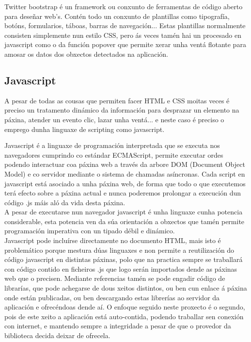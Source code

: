             Twitter bootstrap é un framework ou conxunto de ferramentas de código aberto para 
            deseñar web's. Contén todo un conxunto de plantillas como tipografía, botóns, formularios,
            táboas, barras de navegación... Estas plantillas normalmente consisten simplemente nun
            estilo CSS, pero ás veces tamén hai un procesado en javascript como o da función popover
            que permite xerar unha ventá flotante para amosar os datos dos obxectos detectados na 
            aplicación.
            
    \subsection{Javascript}
        A pesar de todas as cousas que permiten facer HTML e CSS moitas veces é preciso un 
        tratamento dinámico da información para desprazar un elemento na páxina, atender un evento
        clic, lazar unha ventá... e neste caso é preciso o emprego dunha linguaxe de scripting 
        como javascript.
    
        Javascript é a linguaxe de programación interpretada que se executa nos navegadores
        cumprindo co estándar ECMAScript, permite executar ordes podendo interactuar coa páxina 
        web a través da arbore DOM (Document Object Model) e co servidor mediante o sistema de
        chamadas asíncronas. Cada script en javascript está asociado a unha páxina web, de forma
        que todo o que executemos terá efecto sobre a páxina actual e nunca poderemos prolongar
        a execución dun código .js máis aló da vida desta páxina.\\
        
        A pesar de executarse nun navegador javascript é unha linguaxe cunha potencia 
        considerable, esta potencia ven da súa orientación a obxectos que tamén permite 
        programación imperativa con un tipado débil e dinámico.\\
        
        Javascript pode incluírse directamente no documento HTML, mais isto é problemático 
        porque mestura dúas linguaxes e non permite a reutilización do código javascript en
        distintas páxinas, polo que na practica sempre se traballará con código contido en
        ficheiros .js que logo serán importados dende as páxinas web que o precisen. Mediante 
        referencias tamén se pode engadir código de librarías, que pode achegarse de dous xeitos
        distintos, ou ben cun enlace á páxina onde están publicadas, ou ben descargando estas
        librerías ao servidor da aplicación e ofrecéndoas dende aí. O enfoque seguido neste 
        proxecto é o segundo, pois de este xeito a aplicación está auto-contida, podendo traballar
        sen conexión con internet, e mantendo sempre a integridade a pesar de que o provedor
        da biblioteca decida deixar de ofrecela.\\
        
